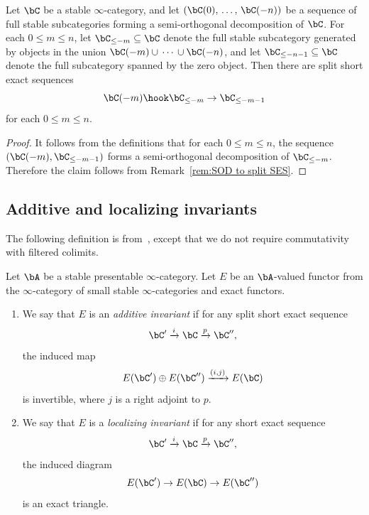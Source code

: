 \begin{lemm}\label{lem:SOD filtration}
Let $\bC$ be a stable $\infty$-category, and let $(\bC(0),\,\ldots,\,\bC(-n))$ be a sequence of full stable subcategories forming a semi-orthogonal decomposition of $\bC$. For each $0 \le m \le n$, let $\bC_{\le -m} \subseteq \bC$ denote the full stable subcategory generated by objects in the union $\bC(-m)\cup\,\cdots\,\cup\bC(-n)$, and let $\bC_{\le -n-1} \subseteq \bC$ denote the full subcategory spanned by the zero object. Then there are split short exact sequences
\[
\bC(-m) \hook \bC_{\le -m} \to \bC_{\le -m-1}
\]
for each $0\le m\le n$.
\end{lemm}

\begin{proof}
It follows from the definitions that for each $0\le m\le n$, the sequence $(\bC(-m), \bC_{\le -m-1})$ forms a semi-orthogonal decomposition of $\bC_{\le -m}$. Therefore the claim follows from Remark~\ref{rem:SOD to split SES}.
\end{proof}

\subsection{Additive and localizing invariants}

The following definition is from~\cite{BlumbergGepnerTabuada}, except that we do not require commutativity with filtered colimits.

\begin{defi}\label{defn:additive invariant}
Let $\bA$ be a stable presentable $\infty$-category. Let $E$ be an $\bA$-valued functor from the $\infty$-category of small stable $\infty$-categories and exact functors.

\begin{enumerate}\romanenumi
\item We say that $E$ is an \emph{additive invariant} if for any split short exact sequence
\[
\bC' \xrightarrow{i} \bC \xrightarrow{p} \bC'',
\]
the induced map
\[
E(\bC') \oplus E(\bC'') \xrightarrow{(i,j)} E(\bC)
\]
is invertible, where $j$ is a right adjoint to $p$.
\item We say that $E$ is a \emph{localizing invariant} if for any short exact sequence
\[
\bC' \xrightarrow{i} \bC \xrightarrow{p} \bC'',
\]
the induced diagram
\[
E(\bC') \to E(\bC) \to E(\bC'')
\]
is an exact triangle.
\end{enumerate}
\end{defi}


